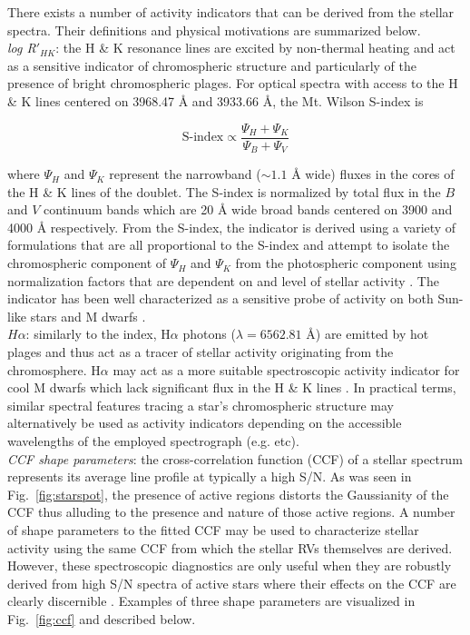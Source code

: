 There exists a number of activity indicators that can be derived from the stellar
spectra. Their definitions and physical motivations are summarized below. \\

\emph{log R$'_{HK}$}:
the \caii{} H \& K resonance lines are excited by non-thermal heating 
and act as a sensitive indicator of chromospheric structure and particularly of
the presence of bright chromospheric plages. 
For optical spectra with access to the \caii{} H \& K lines
centered on 3968.47 \AA{} and 3933.66 \AA{,} the Mt. Wilson S-index is

\begin{equation}
  \text{S-index} \propto \frac{\Psi_H + \Psi_K}{\Psi_B + \Psi_V}
\end{equation}

\noindent where $\Psi_H$ and $\Psi_K$ represent the narrowband
($\sim 1.1$ \AA{} wide) fluxes in the cores of the H \& K lines of the \caii{}
doublet. The S-index is normalized by total flux in the $B$ and $V$ continuum bands
which are 20 \AA{} wide broad bands centered on 3900 and 4000 \AA{} respectively.
From the S-index, the \Rhk{} indicator is derived using a variety of formulations that are
all proportional to the S-index and attempt to isolate the chromospheric component of
$\Psi_H$ and $\Psi_K$ from the photospheric component using normalization factors
that are dependent on \teff{} and level of stellar activity \citep{lovis11}. The
\Rhk{} indicator has been well characterized as a sensitive probe of activity on
both Sun-like stars and M dwarfs
\citep[e.g.][]{wright04,lovis11,astudillodefru17b}. \\

$H\alpha$: 
similarly to the \Rhk{} index, H$\alpha$ photons ($\lambda = 6562.81$ \AA{)} are emitted by
hot plages and thus act as a tracer of stellar activity originating from the chromosphere.
H$\alpha$ may act as a more suitable spectroscopic activity indicator for cool M dwarfs
which lack significant flux in the \caii{} H \& K lines \citep{robertson14}.
In practical terms,  
similar spectral features tracing a star's chromospheric structure may alternatively be used
as activity indicators depending on the accessible wavelengths of the employed spectrograph
(e.g. \hei{,} \nai{,} etc). \\


\emph{CCF shape parameters}:
the cross-correlation function (CCF) of a stellar spectrum represents its average line profile
at typically a high S/N.
As was seen in Fig.~\ref{fig:starspot}, the presence of active regions distorts
the Gaussianity of the CCF thus alluding to the presence and nature of those active regions.
A number of shape parameters to the fitted CCF may be used to characterize stellar activity
using the same CCF from which the stellar RVs themselves are derived. However, these
spectroscopic diagnostics are only useful when they are robustly derived from high S/N
spectra of active stars where their effects on the CCF are clearly discernible \citep{desort07}.
Examples of three
shape parameters are visualized in Fig.~\ref{fig:ccf} and described below. \\

